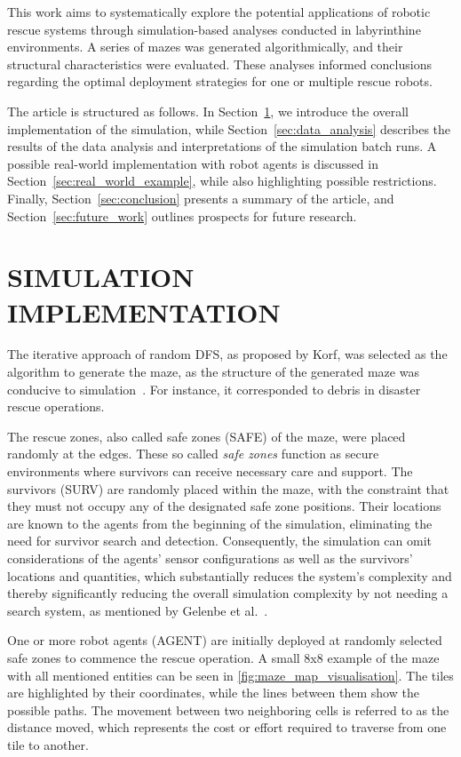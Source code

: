 \documentclass[a4paper,twoside]{article}
\begin{document}
This work aims to systematically explore the potential applications of robotic rescue systems through simulation-based analyses conducted in labyrinthine environments. A series of mazes was generated algorithmically, and their structural characteristics were evaluated. These analyses informed conclusions regarding the optimal deployment strategies for one or multiple rescue robots.

The article is structured as follows.
In Section~\ref{sec:simulation_implementation}, we introduce the overall implementation of the simulation, while Section~\ref{sec:data_analysis} describes the results of the data analysis and interpretations of the simulation batch runs.
A possible real-world implementation with robot agents is discussed in Section~\ref{sec:real_world_example}, while also highlighting possible restrictions.
Finally, Section~\ref{sec:conclusion} presents a summary of the article, and Section~\ref{sec:future_work} outlines prospects for future research.

\section{\uppercase{Simulation Implementation}}
\label{sec:simulation_implementation}

The iterative approach of random DFS, as proposed by Korf, was selected as the algorithm to generate the maze, as the structure of the generated maze was conducive to simulation\ \cite{KORF198597}.
For instance, it corresponded to debris in disaster rescue operations.

The rescue zones, also called safe zones (SAFE) of the maze, were placed randomly at the edges.
These so called \textit{safe zones} function as secure environments where survivors can receive necessary care and support.
The survivors (SURV) are randomly placed within the maze, with the constraint that they must not occupy any of the designated safe zone positions. Their locations are known to the agents from the beginning of the simulation, eliminating the need for survivor search and detection. Consequently, the simulation can omit considerations of the agents’ sensor configurations as well as the survivors’ locations and quantities, which substantially reduces the system’s complexity and thereby significantly reducing the overall simulation complexity by not needing a search system, as mentioned by Gelenbe et al.\ \cite{GELENBE2012Large}.

One or more robot agents (AGENT) are initially deployed at randomly selected safe zones to commence the rescue operation.
A small 8x8 example of the maze with all mentioned entities can be seen in \autoref{fig:maze_map_visualisation}. 
The tiles are highlighted by their coordinates, while the lines between them show the possible paths. 
The movement between two neighboring cells is referred to as the distance moved, which represents the cost or effort required to traverse from one tile to another.
\end{document}

